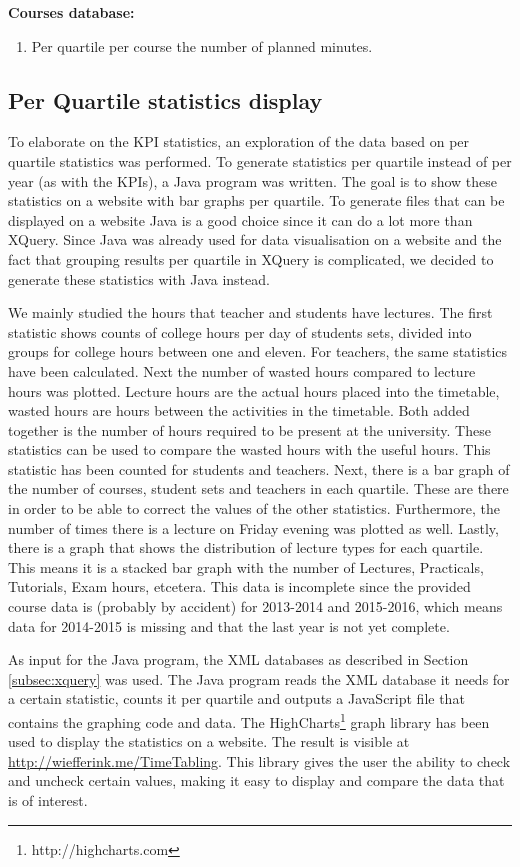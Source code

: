 \textbf{Courses database:}
\begin{enumerate}
	\item Per quartile per course the number of planned minutes.
\end{enumerate}

\subsection{Per Quartile statistics display}
To elaborate on the KPI statistics, an exploration of the data based on per quartile statistics was performed. To generate statistics per quartile instead of per year (as with the KPIs), a Java program was written. The goal is to show these statistics on a website with bar graphs per quartile. To generate files that can be displayed on a website Java is a good choice since it can do a lot more than XQuery. Since Java was already used for data visualisation on a website and the fact that grouping results per quartile in XQuery is complicated, we decided to generate these statistics with Java instead.

We mainly studied the hours that teacher and students have lectures. The first statistic shows counts of college hours per day of students sets, divided into groups for college hours between one and eleven. For teachers, the same statistics have been calculated. Next the number of wasted hours compared to lecture hours was plotted. Lecture hours are the actual hours placed into the timetable, wasted hours are hours between the activities in the time\allowbreak table. Both added together is the number of hours required to be present at the university. These statistics can be used to compare the wasted hours with the useful hours. This statistic has been counted for students and teachers. Next, there is a bar graph of the number of courses, student sets and teachers in each quartile. These are there in order to be able to correct the values of the other statistics. Furthermore, the number of times there is a lecture on Friday evening was plotted as well. Lastly, there is a graph that shows the distribution of lecture types for each quartile. This means it is a stacked bar graph with the number of Lectures, Practicals, Tutorials, Exam hours, etcetera. This data is incomplete since the provided course data is (probably by accident) for 2013-2014 and 2015-2016, which means data for 2014-2015 is missing and that the last year is not yet complete.

As input for the Java program, the XML databases as described in Section \ref{subsec:xquery} was used. The Java program reads the XML database it needs for a certain statistic, counts it per quartile and outputs a JavaScript file that contains the graphing code and data. The HighCharts\footnote{http://highcharts.com} graph library has been used to display the statistics on a website. The result is visible at \url{http://wiefferink.me/TimeTabling}. This library gives the user the ability to check and uncheck certain values, making it easy to display and compare the data that is of interest.





